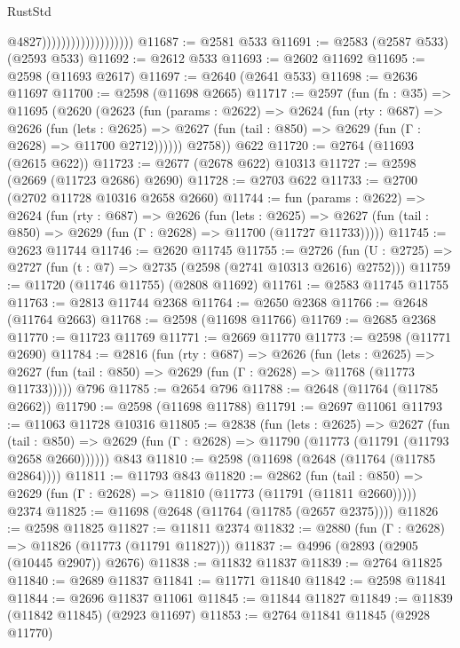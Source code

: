 \begin{lexlean}{RustStd}
\begin{coremodule}
                                          @4827)))))))))))))))))))
@11687 := @2581 @533
@11691 := @2583 (@2587 @533) (@2593 @533)
@11692 := @2612 @533
@11693 := @2602 @11692
@11695 := @2598 (@11693 @2617)
@11697 := @2640 (@2641 @533)
@11698 := @2636 @11697
@11700 := @2598 (@11698 @2665)
@11717 := @2597
    (fun (fn : @35) =>
    @11695
      (@2620
        (@2623
          (fun (params : @2622) =>
          @2624
            (fun (rty : @687) =>
            @2626
              (fun (lets : @2625) =>
              @2627 (fun (tail : @850) => @2629 (fun (Γ : @2628) => @11700 @2712))))))
        @2758))
    @622
@11720 := @2764 (@11693 (@2615 @622))
@11723 := @2677 (@2678 @622) @10313
@11727 := @2598 (@2669 (@11723 @2686) @2690)
@11728 := @2703 @622
@11733 := @2700 (@2702 @11728 @10316 @2658 @2660)
@11744 := fun (params : @2622) =>
  @2624
    (fun (rty : @687) =>
    @2626
      (fun (lets : @2625) =>
      @2627 (fun (tail : @850) => @2629 (fun (Γ : @2628) => @11700 (@11727 @11733)))))
@11745 := @2623 @11744
@11746 := @2620 @11745
@11755 := @2726
    (fun (U : @2725) => @2727 (fun (t : @7) => @2735 (@2598 (@2741 @10313 @2616) @2752)))
@11759 := @11720 (@11746 @11755) (@2808 @11692)
@11761 := @2583 @11745 @11755
@11763 := @2813 @11744 @2368
@11764 := @2650 @2368
@11766 := @2648 (@11764 @2663)
@11768 := @2598 (@11698 @11766)
@11769 := @2685 @2368
@11770 := @11723 @11769
@11771 := @2669 @11770
@11773 := @2598 (@11771 @2690)
@11784 := @2816
    (fun (rty : @687) =>
    @2626
      (fun (lets : @2625) =>
      @2627 (fun (tail : @850) => @2629 (fun (Γ : @2628) => @11768 (@11773 @11733)))))
    @796
@11785 := @2654 @796
@11788 := @2648 (@11764 (@11785 @2662))
@11790 := @2598 (@11698 @11788)
@11791 := @2697 @11061
@11793 := @11063 @11728 @10316
@11805 := @2838
    (fun (lets : @2625) =>
    @2627
      (fun (tail : @850) =>
      @2629 (fun (Γ : @2628) => @11790 (@11773 (@11791 (@11793 @2658 @2660))))))
    @843
@11810 := @2598 (@11698 (@2648 (@11764 (@11785 @2864))))
@11811 := @11793 @843
@11820 := @2862
    (fun (tail : @850) => @2629 (fun (Γ : @2628) => @11810 (@11773 (@11791 (@11811 @2660)))))
    @2374
@11825 := @11698 (@2648 (@11764 (@11785 (@2657 @2375))))
@11826 := @2598 @11825
@11827 := @11811 @2374
@11832 := @2880 (fun (Γ : @2628) => @11826 (@11773 (@11791 @11827)))
@11837 := @4996 (@2893 (@2905 (@10445 @2907)) @2676)
@11838 := @11832 @11837
@11839 := @2764 @11825
@11840 := @2689 @11837
@11841 := @11771 @11840
@11842 := @2598 @11841
@11844 := @2696 @11837 @11061
@11845 := @11844 @11827
@11849 := @11839 (@11842 @11845) (@2923 @11697)
@11853 := @2764 @11841 @11845 (@2928 @11770)

\end{coremodule}
\end{lexlean}
